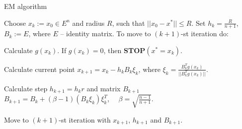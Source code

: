 \begin{frame}{EM algorithm}

\begin{exampleblock}{}
\small
Choose $x_k:=x_0\in E^n$ and radius $R$, such that $||x_0-x^*||\le R$. Set $h_k=\frac{R}{n+1}$, $B_k:=E$, where $E$ -- identity matrix. To move to $(k+1)$-st iteration do:
\end{exampleblock}

\begin{description}
\small
\item[Step 1.] Calculate $g(x_k)$. If $g(x_k)=0$, then \textbf{STOP$(x^*=x_k)$}.
\item[Step 2.] Calculate current point $\displaystyle x_{k+1}=x_k-h_kB_k\xi_k$, where $\displaystyle\xi_k=\frac{B_k^Tg(x_k)}{||B_k^Tg(x_k)||}$.
\item[Step 3.] Calculate step $h_{k+1}=h_kr$ and matrix $B_{k+1}$\\ $B_{k+1}=B_k+(\beta-1)(B_k\xi_k)\xi_k^T$, $\quad\displaystyle\beta=\sqrt{\frac{n-1}{n+1}}$.
\item[Step 4.] Move to $(k+1)$-st iteration with $x_{k+1}$, $h_{k+1}$ and $B_{k+1}$.
\end{description}

\end{frame}